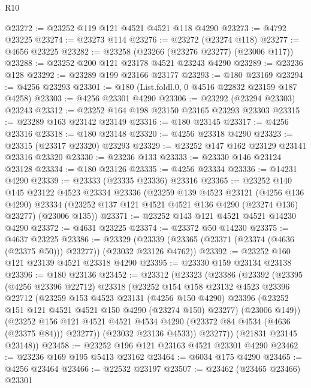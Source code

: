 \begin{lexlean}{R10}
\begin{coremodule}
@23272 := @23252 @119 @121 @4521 @4521 @118 @4290
@23273 := @4792 @23225
@23274 := @23273 @114
@23276 := @23272 (@23274 @118)
@23277 := @4656 @23225
@23282 := @23258 (@23266 (@23276 @23277) (@23006 @117))
@23288 := @23252 @200 @121 @23178 @4521 @23243 @4290
@23289 := @23236 @128
@23292 := @23289 @199 @23166 @23177
@23293 := @180 @23169
@23294 := @4256 @23293
@23301 := @180 (List.foldl.{0, 0} @4516 @22832 @23159 @187 @4258)
@23303 := @4256 @23301 @4290
@23306 := @23292 (@23294 @23303) @23243
@23312 := @23252 @164 @198 @23150 @23165 @23293 @23303
@23315 := @23289 @163 @23142 @23149
@23316 := @180 @23145
@23317 := @4256 @23316
@23318 := @180 @23148
@23320 := @4256 @23318 @4290
@23323 := @23315 (@23317 @23320) @23293
@23329 := @23252 @147 @162 @23129 @23141 @23316 @23320
@23330 := @23236 @133
@23333 := @23330 @146 @23124 @23128
@23334 := @180 @23126
@23335 := @4256 @23334
@23336 := @14231 @4290
@23339 := @23333 (@23335 @23336) @23316
@23365 := @23252
    @140
    @145
    @23122
    @4523
    @23334
    @23336
    (@23259
      @139
      @4523
      @23121
      (@4256 @136 @4290)
      @23334
      (@23252 @137 @121 @4521 @4521 @136 @4290 (@23274 @136) @23277)
      (@23006 @135))
@23371 := @23252 @143 @121 @4521 @4521 @14230 @4290
@23372 := @4631 @23225
@23374 := @23372 @50 @14230
@23375 := @4637 @23225
@23386 := @23329
    (@23339 (@23365 (@23371 (@23374 (@4636 (@23375 @50))) @23277)) (@23032 @23126 @4762))
@23392 := @23252 @160 @121 @23139 @4521 @23318 @4290
@23395 := @23330 @159 @23134 @23138
@23396 := @180 @23136
@23452 := @23312
    (@23323
      (@23386
        (@23392
          (@23395
            (@4256 @23396 @22712)
            @23318
            (@23252
              @154
              @158
              @23132
              @4523
              @23396
              @22712
              (@23259
                @153
                @4523
                @23131
                (@4256 @150 @4290)
                @23396
                (@23252 @151 @121 @4521 @4521 @150 @4290 (@23274 @150) @23277)
                (@23006 @149))
              (@23252
                @156
                @121
                @4521
                @4521
                @4534
                @4290
                (@23372 @84 @4534 (@4636 (@23375 @84)))
                @23277))
            (@23032 @23136 @4533))
          @23277))
      (@21831 @23145 @23148))
@23458 := @23252 @196 @121 @23163 @4521 @23301 @4290
@23462 := @23236 @169 @195 @5413 @23162
@23464 := @6034 @175 @4290
@23465 := @4256 @23464
@23466 := @22532 @23197
@23507 := @23462
    (@23465 @23466)
    @23301

\end{coremodule}
\end{lexlean}
